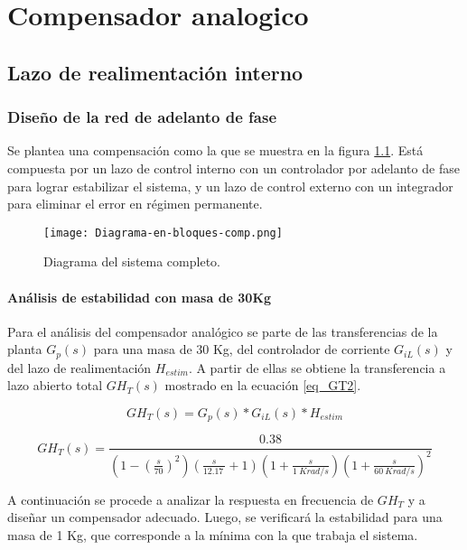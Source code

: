\chapter{Compensador analogico}  \label{cap:Compensador Analogico}

\section{Lazo de realimentación interno}
\subsection{Diseño de la red de adelanto de fase}
\noindent Se plantea una compensación como la que se muestra en la figura \ref{fig:diag-en-bloques-comp}. Está compuesta por un lazo de control interno con un controlador por adelanto de fase para lograr estabilizar el sistema, y un lazo de control externo con un integrador para eliminar el error en régimen permanente.

\begin{figure}[H]
	\centering
	\texttt{[image: Diagrama-en-bloques-comp.png]}
	\caption{Diagrama del sistema completo.}
	\label{fig:diag-en-bloques-comp}
\end{figure}

\subsubsection{Análisis de estabilidad con masa de 30Kg}

\noindent Para el análisis del compensador analógico se parte de las transferencias de la planta $G_{p}(s)$ para una masa de 30 Kg, del controlador de corriente $G_{iL}(s)$  y del lazo de realimentación $H_{estim}$. A partir de ellas se obtiene  la transferencia a lazo abierto total $GH_T(s)$ mostrado en la ecuación \ref{eq_GT2}.


\begin{equation*} \label{eq_GT1}
	GH_T(s)=G_{p}(s)*G_{iL}(s)*H_{estim} 
\end{equation*}

\begin{equation} \label{eq_GT2}
		GH_T(s)=\frac{0.38}{(1-(\frac{s}{70})^2)(\frac{s}{12.17\ }+1)(1+\frac{s}{1\ Krad/s}){(1+\frac{s}{60\ Krad/s})}^2 }	
\end{equation}

\noindent A continuación se procede a analizar la respuesta en frecuencia de $GH_T$ y a diseñar un compensador adecuado. Luego, se verificará la estabilidad para una masa de 1 Kg, que corresponde a la mínima con la que trabaja el sistema.


